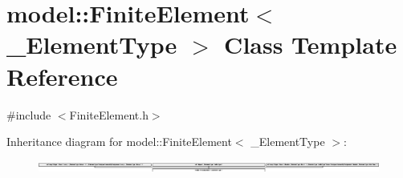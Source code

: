 \hypertarget{classmodel_1_1_finite_element}{}\section{model\+:\+:Finite\+Element$<$ \+\_\+\+Element\+Type $>$ Class Template Reference}
\label{classmodel_1_1_finite_element}


{\ttfamily \#include $<$Finite\+Element.\+h$>$}

Inheritance diagram for model\+:\+:Finite\+Element$<$ \+\_\+\+Element\+Type $>$\+:\begin{figure}[H]
\begin{center}
\leavevmode
\includegraphics[height=0.398435cm]{classmodel_1_1_finite_element}
\end{center}
\end{figure}

